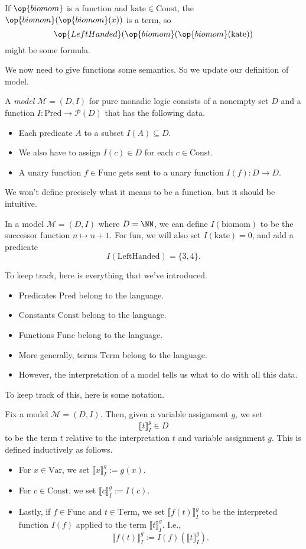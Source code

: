 \documentclass[../notes.tex]{subfiles}
\begin{document}
\begin{ex}
	If $\op{biomom}$ is a function and $\mathrm{kate}\in\mathrm{Const}$, the $\op{biomom}(\op{biomom}(x))$ is a term, so
	\[\op{LeftHanded}(\op{biomom}(\op{biomom}(\mathrm{kate}))\]
	might be some formula.
\end{ex}
We now need to give functions some semantics. So we update our definition of model.
\begin{defihelper}[Model]
	A \textit{model} $\mathcal M=(D,I)$ for pure monadic logic consists of a nonempty set $D$ and a function $I:\mathrm{Pred}\to\mathcal P(D)$ that has the following data.
	\begin{itemize}
		\item Each predicate $A$ to a subset $I(A)\subseteq D$.
		\item We also have to assign $I(c)\in D$ for each $c\in\mathrm{Const}$.
		\item A unary function $f\in\mathrm{Func}$ gets sent to a unary function $I(f):D\to D$.
	\end{itemize}
\end{defihelper}
We won't define precisely what it means to be a function, but it should be intuitive.
\begin{example} \label{ex:kate}
	In a model $\mathcal M=(D,I)$ where $D=\NN$, we can define $I(\mathrm{biomom})$ to be the successor function $n\mapsto n+1$. For fun, we will also set $I(\mathrm{kate})=0$, and add a predicate
	\[I(\mathrm{LeftHanded})=\{3,4\}.\]
\end{example}
To keep track, here is everything that we've introduced.
\begin{itemize}
	\item Predicates $\mathrm{Pred}$ belong to the language.
	\item Constants $\mathrm{Const}$ belong to the language.
	\item Functions $\mathrm{Func}$ belong to the language.
	\item More generally, terms $\mathrm{Term}$ belong to the language.
	\item However, the interpretation of a model tells us what to do with all this data.
\end{itemize}
To keep track of this, here is some notation.
\begin{defi}[Denotation]
	Fix a model $\mathcal M=(D,I)$. Then, given a variable assignment $g$, we set
	\[\llbracket t\rrbracket_I^g\in D\]
	to be the term $t$ relative to the interpretation $t$ and variable assignment $g$. This is defined inductively as follows.
	\begin{itemize}
		\item For $x\in\mathrm{Var}$, we set $\llbracket x\rrbracket_I^g:=g(x)$.
		\item For $c\in\mathrm{Const}$, we set $\llbracket c\rrbracket_I^g:=I(c)$.
		\item Lastly, if $f\in\mathrm{Func}$ and $t\in\mathrm{Term}$, we set $\llbracket f(t)\rrbracket_I^g$ to be the interpreted function $I(f)$ applied to the term $\llbracket t\rrbracket_I^g$. I.e.,
		\[\llbracket f(t)\rrbracket_I^g:=I(f)(\llbracket t\rrbracket_I^g).\]
	\end{itemize}
\end{defi}
\end{document}
